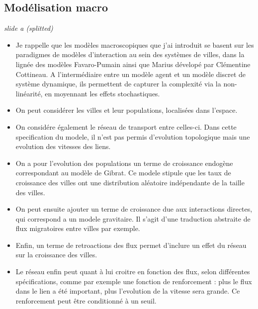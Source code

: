 \documentclass[12pt]{article}
\begin{document}
\newpage



\subsection*{Modélisation macro}


\textit{slide a (splitted)}

\begin{itemize}
	\item Je rappelle que les modèles macroscopiques que j'ai introduit se basent sur les paradigmes de modèles d'interaction au sein des systèmes de villes, dans la lignée des modèles Favaro-Pumain ainsi que Marius dévelopé par Clémentine Cottineau. A l'intermédiaire entre un modèle agent et un modèle discret de système dynamique, ils permettent de capturer la complexité via la non-linéarité, en moyennant les effets stochastiques.
	\item On peut considérer les villes et leur populations, localisées dans l'espace.
	\item On considére également le réseau de transport entre celles-ci. Dans cette specification du modele, il n'est pas permis d'evolution topologique mais une evolution des vitesses des liens. 
	\item On a pour l'evolution des populations un terme de croissance endogène correspondant au modèle de Gibrat. Ce modele stipule que les taux de croissance des villes ont une distribution aléatoire indépendante de la taille des villes.
	\item On peut ensuite ajouter un terme de croissance due aux interactions directes, qui correspond a un modele gravitaire. Il s'agit d'une traduction abstraite de flux migratoires entre villes par exemple.
	\item Enfin, un terme de retroactions des flux permet d'inclure un effet du réseau sur la croissance des villes.
	\item Le réseau enfin peut quant à lui croitre en fonction des flux, selon différentes spécifications, comme par exemple une fonction de renforcement : plus le flux dans le lien a été important, plus l'evolution de la vitesse sera grande. Ce renforcement peut être conditionné à un seuil.
\end{itemize}
\end{document}
